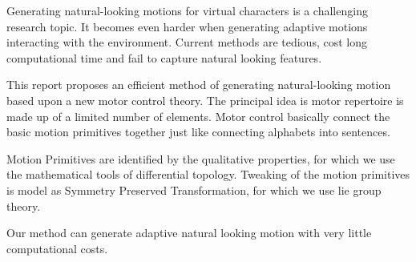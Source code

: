 


\begin{abstracts}        %

Generating natural-looking motions for virtual characters is a challenging research topic.
It becomes even harder when generating adaptive motions interacting with the environment. 
Current methods are tedious, cost long computational time and fail to capture natural looking features.

This report proposes an efficient method of generating natural-looking motion based upon a new motor control theory.
The principal idea is motor repertoire is made up of a limited number of elements. Motor control basically connect the basic motion primitives together just like connecting alphabets into sentences.


Motion Primitives are identified by the qualitative properties, for which we use the mathematical tools of differential topology.
Tweaking of the motion primitives is model as Symmetry Preserved Transformation, for which we use lie group theory.


Our method can generate adaptive natural looking motion with very little computational costs.
\end{abstracts}





